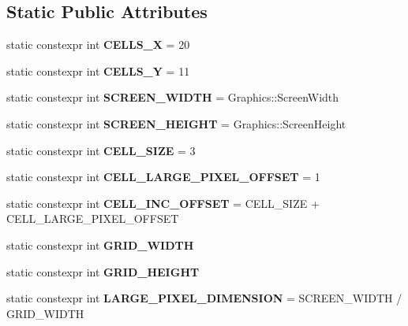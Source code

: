 \subsection*{Static Public Attributes}
\begin{DoxyCompactItemize}
\item 
\mbox{\label{class_board_a492fe7c6d55d277f69dc67c2c08539ac}} 
static constexpr int {\bfseries C\+E\+L\+L\+S\+\_\+X} = 20
\item 
\mbox{\label{class_board_ad3b92faba492e95825f4018d41a0d977}} 
static constexpr int {\bfseries C\+E\+L\+L\+S\+\_\+Y} = 11
\item 
\mbox{\label{class_board_ae512439f91443ec636ea6633a72ada06}} 
static constexpr int {\bfseries S\+C\+R\+E\+E\+N\+\_\+\+W\+I\+D\+TH} = Graphics\+::\+Screen\+Width
\item 
\mbox{\label{class_board_acdf9873415951e78df3fbae321381fd5}} 
static constexpr int {\bfseries S\+C\+R\+E\+E\+N\+\_\+\+H\+E\+I\+G\+HT} = Graphics\+::\+Screen\+Height
\item 
\mbox{\label{class_board_a01a6846968fd31e332f19e1978f27e0d}} 
static constexpr int {\bfseries C\+E\+L\+L\+\_\+\+S\+I\+ZE} = 3
\item 
\mbox{\label{class_board_a51e465bda972205b4c2e1e3b0fab6732}} 
static constexpr int {\bfseries C\+E\+L\+L\+\_\+\+L\+A\+R\+G\+E\+\_\+\+P\+I\+X\+E\+L\+\_\+\+O\+F\+F\+S\+ET} = 1
\item 
\mbox{\label{class_board_a6915825e595c8a98ee5d083212a4f4c8}} 
static constexpr int {\bfseries C\+E\+L\+L\+\_\+\+I\+N\+C\+\_\+\+O\+F\+F\+S\+ET} = C\+E\+L\+L\+\_\+\+S\+I\+ZE + C\+E\+L\+L\+\_\+\+L\+A\+R\+G\+E\+\_\+\+P\+I\+X\+E\+L\+\_\+\+O\+F\+F\+S\+ET
\item 
static constexpr int {\bfseries G\+R\+I\+D\+\_\+\+W\+I\+D\+TH}
\item 
static constexpr int {\bfseries G\+R\+I\+D\+\_\+\+H\+E\+I\+G\+HT}
\item 
\mbox{\label{class_board_a619774ab886154a3d5a74cf98ac42c69}} 
static constexpr int {\bfseries L\+A\+R\+G\+E\+\_\+\+P\+I\+X\+E\+L\+\_\+\+D\+I\+M\+E\+N\+S\+I\+ON} = S\+C\+R\+E\+E\+N\+\_\+\+W\+I\+D\+TH / G\+R\+I\+D\+\_\+\+W\+I\+D\+TH

\end{DoxyCompactItemize}

